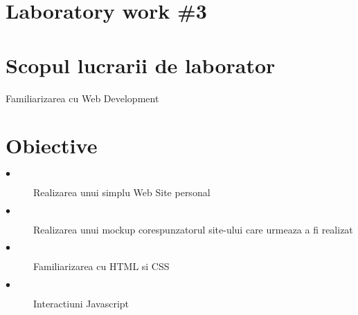 \section*{Laboratory work \#3}

\section{Scopul lucrarii de laborator}
Familiarizarea cu Web Development

\section{Obiective}

\begin{description}
  \item[$\bullet$] Realizarea unui simplu Web Site personal
  \item[$\bullet$] Realizarea unui mockup corespunzatorul site-ului care urmeaza a fi realizat
  \item[$\bullet$] Familiarizarea cu HTML si CSS
   \item[$\bullet$] Interactiuni Javascript
\end{description}